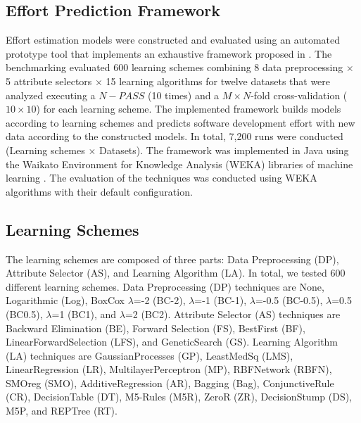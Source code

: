 \documentclass[conference]{IEEEtran}
\begin{document}
\subsection{Effort Prediction Framework}

Effort estimation models were constructed and evaluated using an automated prototype tool that implements an exhaustive framework proposed in \cite{QuesadaLopezMurilloMorera:2016}. The benchmarking evaluated 600 learning schemes combining 8 data preprocessing $\times$ 5 attribute selectors $\times$ 15 learning algorithms for twelve datasets that were analyzed executing a $N-PASS$ (10 times) and a $M\times N$-fold cross-validation ($10\times10$) for each learning scheme. The implemented framework builds models according to learning schemes and predicts software development effort with new data according to the constructed models. In total, 7,200 runs were conducted (Learning schemes $\times$ Datasets). The framework was implemented in Java using the Waikato Environment for Knowledge Analysis (WEKA) libraries of machine learning \cite{hall2009weka}. The evaluation of the techniques was conducted using WEKA algorithms with their default configuration. 

\subsection{Learning Schemes} \label{sec:LearningSchemes}

The learning schemes are composed of three parts: Data Preprocessing (DP), Attribute Selector (AS), and Learning Algorithm (LA). In total, we tested 600 different learning schemes. Data Preprocessing (DP) techniques are None, Logarithmic (Log), BoxCox $\lambda$=-2 (BC-2), $\lambda$=-1 (BC-1), $\lambda$=-0.5 (BC-0.5), $\lambda$=0.5 (BC0.5), $\lambda$=1 (BC1), and $\lambda$=2 (BC2). Attribute Selector (AS) techniques are Backward Elimination (BE), Forward Selection (FS), BestFirst (BF), LinearForwardSelection (LFS), and GeneticSearch (GS). Learning Algorithm (LA) techniques are GaussianProcesses (GP), LeastMedSq (LMS), LinearRegression (LR), MultilayerPerceptron (MP), RBFNetwork (RBFN), SMOreg (SMO), AdditiveRegression (AR), Bagging (Bag), ConjunctiveRule (CR), DecisionTable (DT), M5-Rules (M5R), ZeroR (ZR), DecisionStump (DS), M5P, and REPTree (RT).
\end{document}
